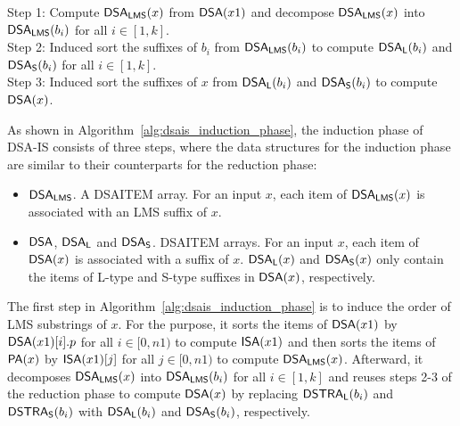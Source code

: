 \documentclass[10pt,journal,compsoc]{IEEEtran}
\begin{document}
\begin{algorithm}
	\SetAlgoNoLine
	
	Step 1: Compute ${\sf DSA_{LMS}}(x)$ from ${\sf DSA}(x1)$ and decompose ${\sf DSA_{LMS}}(x)$ into ${\sf DSA_{LMS}}(b_i)$ for all $i \in [1, k]$.~\label{alg:dsais_induction_phase:1}\\
	Step 2: Induced sort the suffixes of $b_i$ from ${\sf DSA_{LMS}}(b_i)$ to compute ${\sf DSA_L}(b_i)$ and ${\sf DSA_S}(b_i)$ for all $i \in [1, k]$.~\label{alg:dsais_induction_phase:2}\\
	Step 3: Induced sort the suffixes of $x$ from ${\sf DSA_L}(b_i)$ and ${\sf DSA_S}(b_i)$ to compute ${\sf DSA}(x)$.~\label{alg:dsais_induction_phase:3} \\
	
	\caption{The Induction Phase for DSA-IS}
	\label{alg:dsais_induction_phase}
\end{algorithm}

As shown in Algorithm~\ref{alg:dsais_induction_phase}, the induction phase of DSA-IS consists of three steps, where the data structures for the induction phase are similar to their counterparts for the reduction phase:

\begin{itemize}[itemindent = 0ex]
	\item ${\sf DSA_{LMS}}$. A DSAITEM array. For an input $x$, each item of ${\sf DSA_{LMS}}(x)$ is associated with an LMS suffix of $x$.
	
	\item ${\sf DSA}$, ${\sf DSA_L}$ and ${\sf DSA_S}$. DSAITEM arrays. For an input $x$, each item of ${\sf DSA}(x)$ is associated with a suffix of $x$. ${\sf DSA_L}(x)$ and ${\sf DSA_S}(x)$ only contain the items of L-type and S-type suffixes in ${\sf DSA}(x)$, respectively.
	
\end{itemize}

The first step in Algorithm~\ref{alg:dsais_induction_phase} is to induce the order of LMS substrings of $x$. For the purpose, it sorts the items of ${\sf DSA}(x1)$ by ${\sf DSA}(x1)[i].p$ for all $i\in [0, n1)$ to compute ${\sf ISA}(x1)$ and then sorts the items of ${\sf PA}(x)$ by ${\sf ISA}(x1)[j]$ for all $j\in [0,n1)$ to compute ${\sf DSA_{LMS}}(x)$. Afterward, it decomposes ${\sf DSA_{LMS}}(x)$ into ${\sf DSA_{LMS}}(b_i)$ for all $i \in [1, k]$ and reuses steps 2-3 of the reduction phase to compute ${\sf DSA}(x)$ by replacing ${\sf DSTRA_L}(b_i)$ and ${\sf DSTRA_S}(b_i)$ with ${\sf DSA_L}(b_i)$ and ${\sf DSA_S}(b_i)$, respectively.
\end{document}
